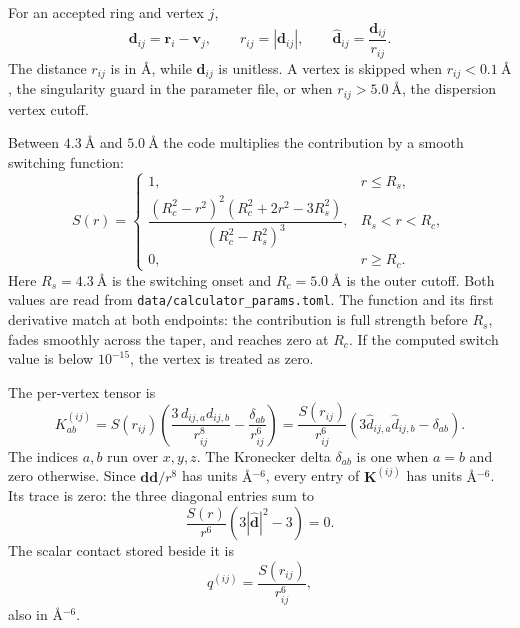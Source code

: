 \documentclass[11pt]{article}
\begin{document}
For an accepted ring and vertex \(j\),
\begin{equation}
  \bm d_{ij}=\bm r_i-\bm v_j,\qquad
  r_{ij}=|\bm d_{ij}|,\qquad
  \hat{\bm d}_{ij}=\frac{\bm d_{ij}}{r_{ij}} .
  \label{eq:vertex-geometry}
\end{equation}
The distance \(r_{ij}\) is in \(\si{\angstrom}\), while
\(\hat{\bm d}_{ij}\) is unitless. A vertex is skipped when
\(r_{ij}<\SI{0.1}{\angstrom}\), the singularity guard in the parameter file,
or when \(r_{ij}>\SI{5.0}{\angstrom}\), the dispersion vertex cutoff.

Between \(\SI{4.3}{\angstrom}\) and \(\SI{5.0}{\angstrom}\) the code multiplies
the contribution by a smooth switching function:
\begin{equation}
S(r)=
\begin{cases}
1, & r\le R_s,\\[3pt]
\dfrac{(R_c^2-r^2)^2(R_c^2+2r^2-3R_s^2)}
      {(R_c^2-R_s^2)^3}, & R_s<r<R_c,\\[9pt]
0, & r\ge R_c .
\end{cases}
\label{eq:switch}
\end{equation}
Here \(R_s=\SI{4.3}{\angstrom}\) is the switching onset and
\(R_c=\SI{5.0}{\angstrom}\) is the outer cutoff. Both values are read from
\texttt{data/calculator\_params.toml}. The function and its first derivative
match at both endpoints: the contribution is full strength before
\(R_s\), fades smoothly across the taper, and reaches zero at \(R_c\). If the
computed switch value is below \(10^{-15}\), the vertex is treated as zero.

The per-vertex tensor is
\begin{equation}
  K^{(ij)}_{ab}
  =
  S(r_{ij})
  \left(
    \frac{3\,d_{ij,a}d_{ij,b}}{r_{ij}^{8}}
    -\frac{\delta_{ab}}{r_{ij}^{6}}
  \right)
  =
  \frac{S(r_{ij})}{r_{ij}^{6}}
  \left(3\hat d_{ij,a}\hat d_{ij,b}-\delta_{ab}\right).
  \label{eq:kernel}
\end{equation}
The indices \(a,b\) run over \(x,y,z\). The Kronecker delta
\(\delta_{ab}\) is one when \(a=b\) and zero otherwise. Since
\(\bm d\bm d/r^8\) has units \(\si{\angstrom^{-6}}\), every entry of
\(\bm K^{(ij)}\) has units \(\si{\angstrom^{-6}}\). Its trace is zero:
the three diagonal entries sum to
\[
  \frac{S(r)}{r^6}\left(3|\hat{\bm d}|^2-3\right)=0 .
\]
The scalar contact stored beside it is
\begin{equation}
  q^{(ij)}=\frac{S(r_{ij})}{r_{ij}^{6}},
  \label{eq:scalar}
\end{equation}
also in \(\si{\angstrom^{-6}}\).
\end{document}

